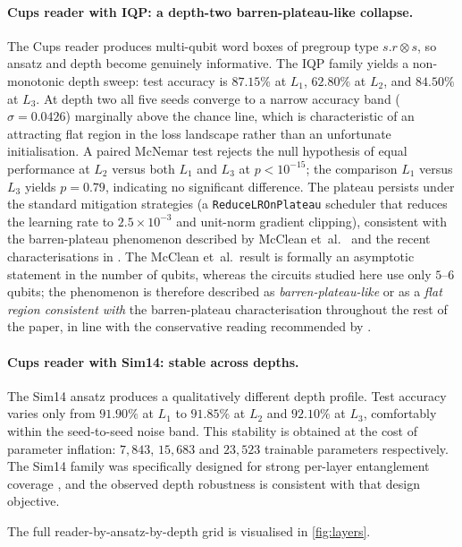\documentclass[runningheads]{llncs}
\begin{document}
\paragraph{Cups reader with IQP: a depth-two barren-plateau-like collapse.} The Cups
reader produces multi-qubit word boxes of pregroup type \(s.r \otimes s\),
so ansatz and depth become genuinely informative. The IQP family yields
a non-monotonic depth sweep: test accuracy is \(87.15\%\) at \(L_1\),
\(62.80\%\) at \(L_2\), and \(84.50\%\) at \(L_3\). At depth two all
five seeds converge to a narrow accuracy band
(\(\sigma = 0.0426\)) marginally above the chance line, which is
characteristic of an attracting flat region in the loss landscape rather
than an unfortunate initialisation. A paired McNemar test rejects the
null hypothesis of equal performance at \(L_2\) versus both \(L_1\)
and \(L_3\) at \(p < 10^{-15}\); the comparison \(L_1\) versus \(L_3\)
yields \(p = 0.79\), indicating no significant difference. The plateau
persists under the standard mitigation strategies (a
\texttt{ReduceLROnPlateau} scheduler that reduces the learning rate to
\(2.5 \times 10^{-3}\) and unit-norm gradient clipping), consistent with
the barren-plateau phenomenon described by
McClean et~al.~\cite{mcclean2018} and the recent characterisations in
\cite{larocca2025,ragone2024}. The McClean et~al.\ result is
formally an asymptotic statement in the number of qubits, whereas
the circuits studied here use only \(5\)--\(6\) qubits; the
phenomenon is therefore described as \emph{barren-plateau-like} or
as a \emph{flat region consistent with} the barren-plateau
characterisation throughout the rest of the paper, in line with the
conservative reading recommended by \cite{cerezo2022qml}.

\paragraph{Cups reader with Sim14: stable across depths.} The Sim14
ansatz produces a qualitatively different depth profile. Test accuracy
varies only from \(91.90\%\) at \(L_1\) to \(91.85\%\) at \(L_2\) and
\(92.10\%\) at \(L_3\), comfortably within the seed-to-seed noise band.
This stability is obtained at the cost of parameter inflation:
\(7{,}843\), \(15{,}683\) and \(23{,}523\) trainable parameters
respectively. The Sim14 family was specifically designed for strong
per-layer entanglement coverage \cite{sim2019}, and the observed depth
robustness is consistent with that design objective.

The full reader-by-ansatz-by-depth grid is visualised in
\cref{fig:layers}.
\end{document}
